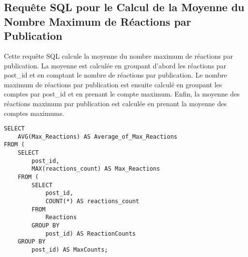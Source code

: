 \subsection{Requête SQL pour le Calcul de la Moyenne du Nombre Maximum de Réactions par Publication}

Cette requête SQL calcule la moyenne du nombre maximum de réactions par publication. La moyenne est calculée en groupant d'abord les réactions par post\_id et en comptant le nombre de réactions par publication. 
Le nombre maximum de réactions par publication est ensuite calculé en groupant les comptes par post\_id et en prenant le compte maximum. 
Enfin, la moyenne des réactions maximum par publication est calculée en prenant la moyenne des comptes maximums.

\begin{lstlisting}
SELECT
    AVG(Max_Reactions) AS Average_of_Max_Reactions
FROM (
    SELECT
        post_id,
        MAX(reactions_count) AS Max_Reactions
    FROM (
        SELECT
            post_id,
            COUNT(*) AS reactions_count
        FROM
            Reactions
        GROUP BY
            post_id) AS ReactionCounts
    GROUP BY
        post_id) AS MaxCounts;
\end{lstlisting}